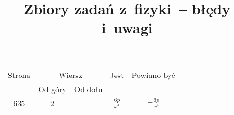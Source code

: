 \documentclass[a4paper,11pt]{article}
\title{Zbiory zadań z~fizyki~-- błędy i~uwagi}
\begin{document}





\maketitle %

















\begin{center}

  \begin{tabular}{|c|c|c|c|c|}
    \hline
    & \multicolumn{2}{c|}{} & & \\
    Strona & \multicolumn{2}{c|}{Wiersz} & Jest
                              & Powinno być \\ \cline{2-3}
    & Od góry & Od dołu & & \\
    \hline
    635 &  2 & & $\frac{ 6 p }{ x^{ 4 } }$ & $-\frac{ 6 p }{ x^{ 4 } }$ \\
    \hline
  \end{tabular}

\end{center}
\end{document}

